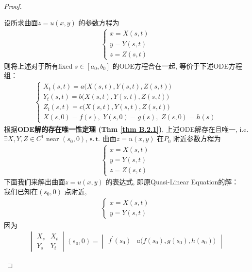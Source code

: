 \begin{thm}
\begin{proof}
\begin{itemize}
				设所求曲面$z = u(x , y)$ 的参数方程为
				\begin{align*}
					\begin{cases}
						x = X(s , t) \\
						y = Y(s , t) \\
						z = Z(s , t)
					\end{cases}
				\end{align*}
				则将上述对于所有fixed $s \in [a_0 , b_0]$ 的ODE方程合在一起, 等价于下述ODE方程组：
				\begin{align*}
					\begin{cases}
						X_{t}(s , t) = a \Big( X(s , t) , Y(s , t) , Z(s , t) \Big) \\
						Y_{t}(s , t) = b \Big( X(s , t) , Y(s , t) , Z(s , t) \Big) \\
						Z_{t}(s , t) = c \Big( X(s , t) , Y(s , t) , Z(s , t) \Big) \\
						X(s , 0) = f(s) , \,\, Y(s , 0) = g(s) , \,\, Z(s , 0) = h(s)
					\end{cases}
				\end{align*}
				根据\textbf{ODE解的存在唯一性定理 (Thm \ref{thm B.2.1})}, 上述ODE解存在且唯一, i.e. \\
				$\exists X , Y , Z \in C^1$ near $(s_0 , 0)$, $\operatorname{s.t.}$ 曲面$z = u(x , y)$ 在$P_0$ 附近参数方程为
				\begin{align*}
					\begin{cases}
						x = X(s , t) \\
						y = Y(s , t) \\
						z = Z(s , t)
					\end{cases}
				\end{align*}
				下面我们来解出曲面$z = u(x , y)$ 的表达式, 即原Quasi-Linear Equation的解：\\
				我们已知在$(s_0 , 0)$ 点附近, 
				\begin{align*}
					\begin{cases}
						x = X(s , t) \\
						y = Y(s , t)
					\end{cases}
				\end{align*}
				因为
				\begin{align*}
					\begin{vmatrix}
						X_s &X_t \\
						Y_s &Y_t
					\end{vmatrix} (s_0 , 0) 
					= 
					\begin{vmatrix}
						f^{'}(s_0) &a \Big( f(s_0) , g(s_0) , h(s_0) \Big) \\

\end{vmatrix}
\end{align*}
\end{itemize}
\end{proof}
\end{thm}
